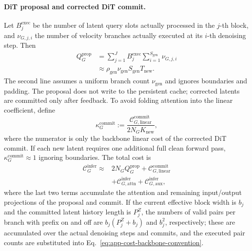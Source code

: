 \paragraph{DiT proposal and corrected DiT commit.}
Let $B_j^{\mathrm{exec}}$ be the number of latent query slots actually processed in the $j$-th block, and $\nu_{G,j,i}$ the number of velocity branches actually executed at its $i$-th denoising step. Then
\begin{equation}
\begin{aligned}
    Q_G^{\mathrm{prop}}
    &=\sum_{j=1}^{J}B_j^{\mathrm{exec}}
      \sum_{i=1}^{S_{\mathrm{gen}}}\nu_{G,j,i}\\
    &\approx\rho_{\mathrm{gen}}\nu_{\mathrm{gen}}S_{\mathrm{gen}}T_{\mathrm{new}}.
\end{aligned}
\label{eq:app-cost-gen-proposal-query}
\end{equation}
The second line assumes a uniform branch count $\nu_{\mathrm{gen}}$ and ignores boundaries and padding. The proposal does not write to the persistent cache; corrected latents are committed only after feedback. To avoid folding attention into the linear coefficient, define
\begin{equation}
    \kappa_G^{\mathrm{commit}}
    :=\frac{\mathcal C_{G,\mathrm{linear}}^{\mathrm{commit}}}
            {2N_GK_{\mathrm{new}}},
    \label{eq:app-cost-gen-commit-factor}
\end{equation}
where the numerator is only the backbone linear cost of the corrected DiT commit. If each new latent requires one additional full clean forward pass, $\kappa_G^{\mathrm{commit}}\approx1$ ignoring boundaries. The total cost is
\begin{equation}
\begin{aligned}
    \mathcal C_G^{\mathrm{infer}}
    \approx{}&2N_GQ_G^{\mathrm{prop}}
       +\mathcal C_{G,\mathrm{linear}}^{\mathrm{commit}}\\
       &+\mathcal C_{G,\mathrm{attn}}^{\mathrm{infer}}
       +\mathcal C_{G,\mathrm{aux}}^{\mathrm{infer}},
\end{aligned}
\label{eq:app-cost-gen-infer}
\end{equation}
where the last two terms accumulate the attention and remaining input/output projections of the proposal and commit. If the current effective block width is $b_j$ and the committed latent history length is $P_j^Z$, the numbers of valid pairs per branch with prefix on and off are $b_j(P_j^Z+b_j)$ and $b_j^2$, respectively; these are accumulated over the actual denoising steps and commits, and the executed pair counts are substituted into Eq.~\eqref{eq:app-cost-backbone-convention}.

